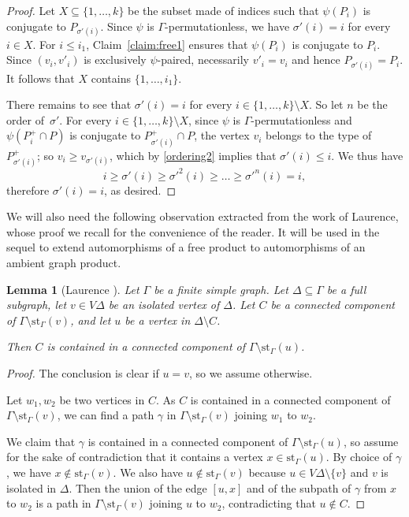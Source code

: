 \documentclass[a4paper,english,11pt]{article}
\newtheorem{lemma}[de]{Lemma}
\theoremstyle{definition}
\theoremstyle{remark}
\newcommand{\st}{\mathrm{st}}
\begin{document}
\begin{proof}
Let $X\subseteq\{1,\dots,k\}$ be the subset made of indices such that $\psi(P_i)$ is conjugate to $P_{\sigma'(i)}$. Since $\psi$ is $\Gamma$-permutationless, we have $\sigma'(i)=i$ for every $i\in X$. For $i\le i_1$, Claim~\ref{claim:free1} ensures that $\psi(P_i)$ is conjugate to $P_i$. Since $(v_i,v'_i)$ is exclusively $\psi$-paired, necessarily $v'_i=v_i$ and hence $P_{\sigma'(i)}=P_i$. It follows that $X$ contains $\{1,\dots,i_1\}$.

There remains to see that $\sigma'(i)=i$ for every $i\in\{1,\dots,k\}\setminus X$. So let $n$ be the order of~$\sigma'$. For every $i\in \{1,\dots,k\}\setminus X$, since $\psi$ is $\Gamma$-permutationless and $\psi(P^+_i\cap P)$ is conjugate to $P^+_{\sigma'(i)}\cap P$, the vertex $v_i$ belongs to the type of $P^+_{\sigma'(i)}$; so $v_i\geq  v_{\sigma'(i)}$, which by \eqref{ordering2} implies that $\sigma'(i)\le i$. We thus have 
\[i\geq\sigma'(i)\geq {\sigma'}^2(i)\geq\dots\geq{\sigma'}^n(i)=i,\] 
therefore $\sigma'(i)=i$, as desired.     
\end{proof}

We will also need the following observation extracted from the work of Laurence, whose proof we recall for the convenience of the reader. It will be used in the sequel to extend automorphisms of a free product to automorphisms of an ambient graph product.

\begin{lemma}[{Laurence \cite[Proposition~6.5]{Lau}}]\label{lemma:Laurence} 
Let $\Gamma$ be a finite simple graph. Let $\Delta\subseteq\Gamma$ be a full subgraph, let $v\in V\Delta$ be an isolated vertex of $\Delta$. 
Let $C$ be a connected component of $\Gamma\setminus\st_\Gamma(v)$, and let $u$ be a vertex in $\Delta\setminus C$. 
 
 Then $C$ is contained in a connected component of $\Gamma\setminus\st_\Gamma(u)$.
\end{lemma}

\begin{proof}
The conclusion is clear if $u=v$, so we assume otherwise.

Let $w_1,w_2$ be two vertices in $C$. As $C$ is contained in a connected component of $\Gamma\setminus\st_\Gamma(v)$, we can find a path $\gamma$ in $\Gamma\setminus\st_\Gamma(v)$ joining $w_1$ to $w_2$. 

We claim that $\gamma$ is contained in a connected component of $\Gamma\setminus\st_\Gamma(u)$, so assume for the sake of contradiction that it contains a vertex $x\in\st_\Gamma(u)$. By choice of $\gamma$, we have $x\notin\st_\Gamma(v)$. We also have $u\notin\st_\Gamma(v)$ because $u\in V\Delta\setminus\{v\}$ and $v$ is isolated in $\Delta$. Then the union of the edge $[u,x]$ and of the subpath of $\gamma$ from $x$ to $w_2$ is a path in $\Gamma\setminus\st_\Gamma(v)$ joining $u$ to $w_2$, contradicting that $u\notin C$. 
\end{proof} 
\end{document}
